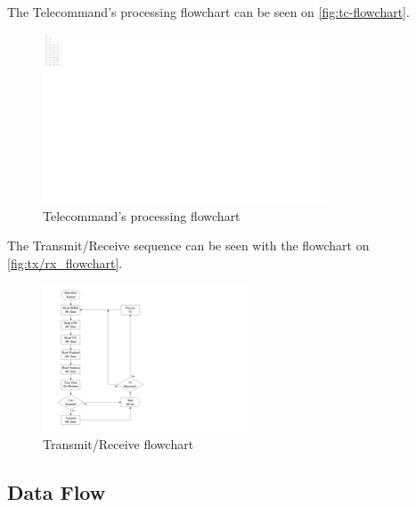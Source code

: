 The Telecommand's processing flowchart can be seen on \autoref{fig:tc-flowchart}.

\begin{figure}[!ht]
    \begin{center}
        \includegraphics[width=0.75\textwidth]{figures/tc-flowchart.pdf}
        \caption{Telecommand's processing flowchart}
        \label{fig:tc-flowchart}
    \end{center}
\end{figure}

The Transmit/Receive sequence can be seen with the flowchart on \autoref{fig:tx/rx_flowchart}.

\begin{figure}[!ht]
    \begin{center}
        \includegraphics[width=0.55\textwidth]{figures/obdh-flowchart.pdf}
        \caption{Transmit/Receive flowchart}
        \label{fig:tx/rx_flowchart}
    \end{center}
\end{figure}

\subsection{Data Flow}

